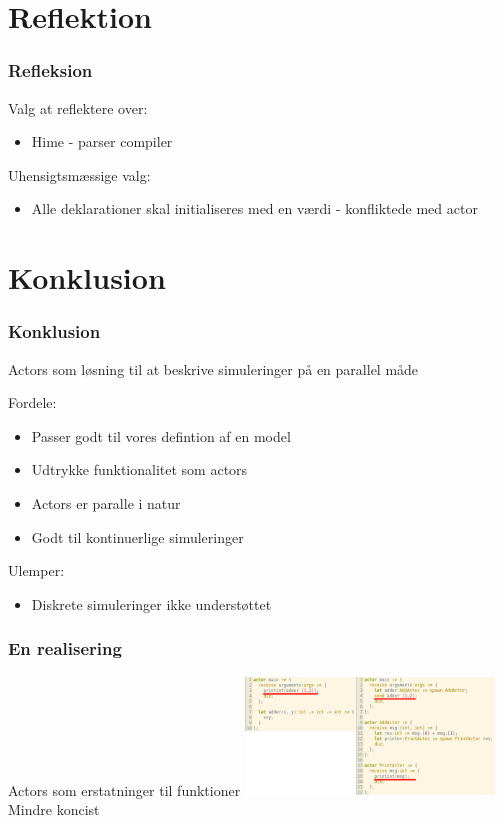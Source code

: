 \section{Reflektion}
\begin{frame}
	\frametitle{Refleksion}
	Valg at reflektere over:
	  \begin{itemize}
	    \item{Hime - parser compiler}
	  \end{itemize}
  Uhensigtsmæssige valg:
	  \begin{itemize}
	    \item Alle deklarationer skal initialiseres med en værdi - konfliktede med actor
	  \end{itemize}
\end{frame}

\section{Konklusion}
\begin{frame}
	\frametitle{Konklusion}
	Actors som løsning til at beskrive simuleringer på en parallel måde
	
	
  Fordele:
    \begin{itemize}
      \item Passer godt til vores defintion af en model
      \item Udtrykke funktionalitet som actors
      \item Actors er paralle i natur
      \item Godt til kontinuerlige simuleringer
    \end{itemize}
  Ulemper:
    \begin{itemize}
      \item Diskrete simuleringer ikke understøttet
    \end{itemize}
\end{frame}

\begin{frame}
	\frametitle{En realisering}
	Actors som erstatninger til funktioner
	\includegraphics[width=250px]{Images/actorFunc.png}\newline
	Mindre koncist
\end{frame}

